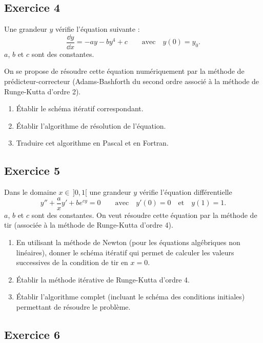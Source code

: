 \subsection*{Exercice 4}

Une grandeur $y$ vérifie l'équation suivante :
\[
  \frac{\dd y}{\dd x} = -ay - by^4 + c
  \qquad\text{avec}\quad y(0) = y_0 .
\]
$a$, $b$ et $c$ sont des constantes.

On se propose de résoudre cette équation numériquement par la méthode de
prédicteur-correcteur (Adams-Bashforth du second ordre associé à la méthode
de Runge-Kutta d'ordre 2).
\begin{enumerate}[label=\arabic*)-]
  \item Établir le schéma itératif correspondant.
  \item Établir l'algorithme de résolution de l'équation.
  \item Traduire cet algorithme en Pascal et en Fortran.
\end{enumerate}

\subsection*{Exercice 5}

Dans le domaine $x \in\, ]0, 1[$ une grandeur $y$ vérifie l'équation
différentielle
\[
  y'' + \frac{a}{x}y' + be^{cy} = 0
  \qquad\text{avec}\quad y'(0) = 0 \quad\text{et}\quad y(1) = 1 .
\]
$a$, $b$ et $c$ sont des constantes. On veut résoudre cette équation par la
méthode de tir (associée à la méthode de Runge-Kutta d'ordre 4).
\begin{enumerate}[label=\arabic*)-]
  \item En utilisant la méthode de Newton (pour les équations algébriques non
        linéaires), donner le schéma itératif qui permet de calculer les
        valeurs successives de la condition de tir en $x = 0$.
  \item Établir la méthode itérative de Runge-Kutta d'ordre 4.
  \item Établir l'algorithme complet (incluant le schéma des conditions
        initiales) permettant de résoudre le problème.
\end{enumerate}

\subsection*{Exercice 6}

